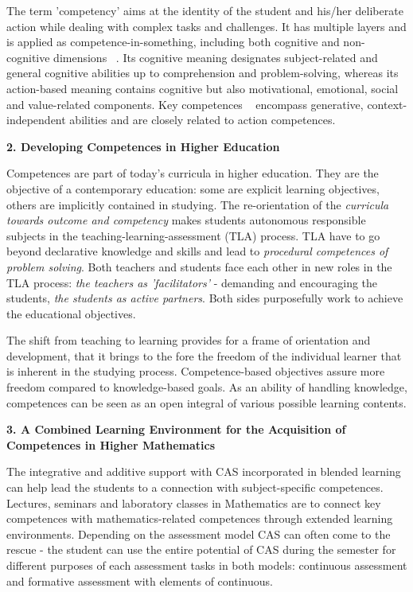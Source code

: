 \documentclass[11pt]{article}
\begin{document}
    The term 'competency' aims at the identity of the student and his/her deliberate action while dealing with complex tasks and challenges. It has multiple layers and is applied as competence-in-something, including both cognitive and non-cognitive dimensions ~\cite{CHUR1}. Its cognitive meaning designates subject-related and general cognitive abilities up to comprehension and problem-solving, whereas its action-based meaning contains cognitive but also motivational, emotional, social and value-related components. Key competences ~\cite{CHUR2} encompass generative, context-independent abilities and are closely related to action competences.

  \vspace{5mm}


\textbf{	2.	Developing Competences in Higher Education}

\vspace{2mm}

Competences are part of today's curricula in higher education. They are the objective of a contemporary education: some are explicit learning objectives, others are implicitly contained in studying. The re-orientation of the \emph{curricula towards outcome and competency} makes students autonomous responsible subjects in the teaching-learning-assessment (TLA) process. TLA have to go beyond declarative knowledge and skills and lead to \emph{procedural competences of problem solving}. Both teachers and students face each other in new roles in the TLA process: \emph{the teachers as 'facilitators'} - demanding and encouraging the students, \emph{the students as active partners}. Both sides purposefully work to achieve the educational objectives.

The shift from teaching to learning provides for a frame of orientation and development, that it brings to the fore the freedom of the individual learner that is inherent in the studying process. Competence-based objectives assure more freedom compared to knowledge-based goals.  As an ability of handling knowledge, competences can be seen as an open integral of various possible learning contents.

  \vspace{2mm}


\textbf{3. A Combined Learning Environment for the Acquisition of Competences in Higher Mathematics}

\vspace{2mm}

The integrative and additive support with CAS incorporated in blended learning can help lead the students to a connection with subject-specific competences. Lectures, seminars and laboratory classes in Mathematics are to connect key competences with mathematics-related competences through extended learning environments.
Depending on the assessment model CAS can often come to the rescue - the student can use the entire potential of CAS during the semester for different purposes of each assessment tasks in both models: continuous assessment and formative assessment with elements of continuous.
\end{document}

